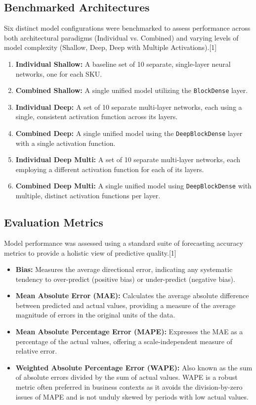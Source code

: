 \documentclass{article}
\begin{document}
\subsection{Benchmarked Architectures}
Six distinct model configurations were benchmarked to assess performance across both architectural paradigms (Individual vs. Combined) and varying levels of model complexity (Shallow, Deep, Deep with Multiple Activations).[1]
\begin{enumerate}
    \item \textbf{Individual Shallow:} A baseline set of 10 separate, single-layer neural networks, one for each SKU.
    \item \textbf{Combined Shallow:} A single unified model utilizing the \texttt{BlockDense} layer.
    \item \textbf{Individual Deep:} A set of 10 separate multi-layer networks, each using a single, consistent activation function across its layers.
    \item \textbf{Combined Deep:} A single unified model using the \texttt{DeepBlockDense} layer with a single activation function.
    \item \textbf{Individual Deep Multi:} A set of 10 separate multi-layer networks, each employing a different activation function for each of its layers.
    \item \textbf{Combined Deep Multi:} A single unified model using \texttt{DeepBlockDense} with multiple, distinct activation functions per layer.
\end{enumerate}

\subsection{Evaluation Metrics}
Model performance was assessed using a standard suite of forecasting accuracy metrics to provide a holistic view of predictive quality.[1]
\begin{itemize}
    \item \textbf{Bias:} Measures the average directional error, indicating any systematic tendency to over-predict (positive bias) or under-predict (negative bias).
    \item \textbf{Mean Absolute Error (MAE):} Calculates the average absolute difference between predicted and actual values, providing a measure of the average magnitude of errors in the original units of the data.
    \item \textbf{Mean Absolute Percentage Error (MAPE):} Expresses the MAE as a percentage of the actual values, offering a scale-independent measure of relative error.
    \item \textbf{Weighted Absolute Percentage Error (WAPE):} Also known as the sum of absolute errors divided by the sum of actual values. WAPE is a robust metric often preferred in business contexts as it avoids the division-by-zero issues of MAPE and is not unduly skewed by periods with low actual values.
\end{itemize}
\end{document}
